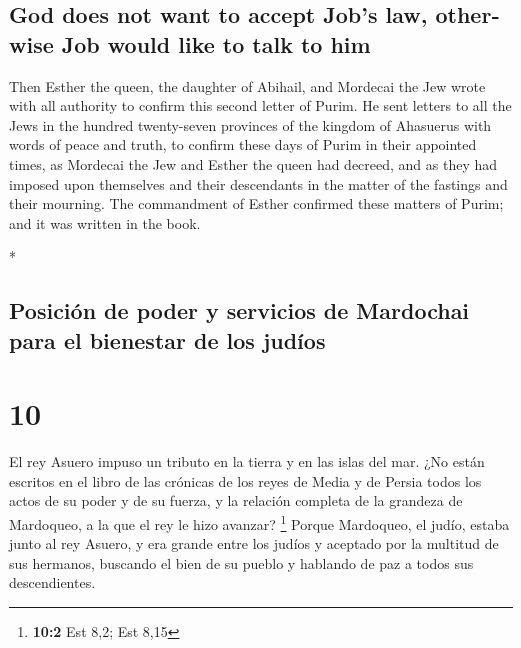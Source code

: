 \begin{paracol}{2}
\begin{otherlanguage}{english}
\hypertarget{god-does-not-want-to-accept-jobs-law-otherwise-job-would-like-to-talk-to-him}{%
\subsection{God does not want to accept Job's law, otherwise Job would
like to talk to
him}\label{god-does-not-want-to-accept-jobs-law-otherwise-job-would-like-to-talk-to-him}}

 Then Esther the queen, the daughter of Abihail, and
Mordecai the Jew wrote with all authority to confirm this second letter
of Purim.  He sent letters to all the Jews in the hundred
twenty-seven provinces of the kingdom of Ahasuerus with words of peace
and truth,  to confirm these days of Purim in their
appointed times, as Mordecai the Jew and Esther the queen had decreed,
and as they had imposed upon themselves and their descendants in the
matter of the fastings and their mourning.  The
commandment of Esther confirmed these matters of Purim; and it was
written in the book.

\end{otherlanguage}

\switchcolumn[0]*

\hypertarget{posiciuxf3n-de-poder-y-servicios-de-mardochai-para-el-bienestar-de-los-juduxedos}{%
\subsection{Posición de poder y servicios de Mardochai para el bienestar
de los
judíos}\label{posiciuxf3n-de-poder-y-servicios-de-mardochai-para-el-bienestar-de-los-juduxedos}}

\hypertarget{section-18}{%
\section{10}\label{section-18}}

 El rey Asuero impuso un tributo en la tierra y en las
islas del mar.  ¿No están escritos en el libro de las
crónicas de los reyes de Media y de Persia todos los actos de su poder y
de su fuerza, y la relación completa de la grandeza de Mardoqueo, a la
que el rey le hizo avanzar? \footnote{\textbf{10:2} Est 8,2; Est 8,15}
 Porque Mardoqueo, el judío, estaba junto al rey Asuero, y
era grande entre los judíos y aceptado por la multitud de sus hermanos,
buscando el bien de su pueblo y hablando de paz a todos sus
descendientes. \switchcolumn \begin{otherlanguage}{english}


\end{otherlanguage}
\end{paracol}

